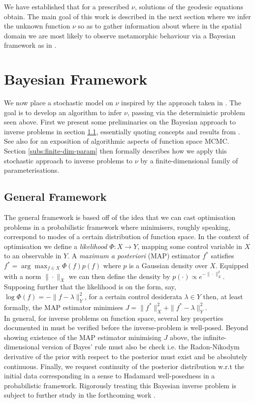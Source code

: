 \documentclass[runningheads]{llncs}
\begin{document}
We have established that for a prescribed $\nu$, solutions of the geodesic
equations obtain. The main goal of this work is described in the next section
where we infer the unknown function $\nu$ so as to gather information about
where in the spatial domain we are most likely to observe metamorphic behaviour
via a Bayesian framework as in \cite{dashti2017bayesian}.

\section{Bayesian Framework}\label{sec:bayesian}

We now place a stochastic model on $\nu$ inspired by the approach taken in
\cite{cotter2013bayesian}. The goal is to develop an algorithm to infer $\nu$,
passing via the deterministic problem seen above.  First we present some
preliminaries on the Bayesian approach to inverse problems in section
\ref{subs:gf}, essentially quoting concepts and results from
\cite{dashti2017bayesian}. See also \cite{cotter2013mcmc} for an exposition of
algorithmic aspects of function space MCMC. Section \ref{subs:finite-dim-param}
then formally describes how we apply this stochastic approach to inverse
problems to $\nu$ by a finite-dimensional family of parameterisations.

\subsection{General Framework}\label{subs:gf}

The general framework is based off of the idea that we can cast optimisation
problems in a probabilistic framework where minimisers, roughly speaking,
correspond to modes of a certain distribution of function space.  In the context
of optimisation we define a \emph{likelihood} $\Phi : X\rightarrow Y$, mapping
some control variable in $X$ to an observable in $Y$.  A \emph{maximum a
posteriori} (MAP) estimator $f^*$ satisfies $f^* = \arg\max_{f\in X} \Phi(f)
p(f)$ where $p$ is a Gaussian density over $X$. Equipped with a norm
$\|\cdot\|_X$ we can then define the density by $p(\cdot) \propto
e^{-\|\cdot\|_X^2}$.  Supposing further that the likelihood is on the form, say,
$\log \Phi(f) = -\|f-\lambda\|_Y^2$, for a certain control desiderata $\lambda\in Y$
then, at least formally, the MAP estimator minimises $J =\|f^*\|_X^2 +
\|f^*-\lambda\|_Y^2$.\\

In general, for inverse problems on function space, several key properties
documented in \cite{?} must be verified before the inverse-problem is
well-posed. Beyond showing existence of the MAP estimator minimising $J$ above,
the infinite-dimensional version of Bayes' rule must also be check i.e. the
Radon-Nikodym derivative of the prior with respect to the posterior must exist
and be absolutely continuous. Finally, we request continuity of the posterior
distribution w.r.t the initial data corresponding in a sense to Hadamard
well-posedness in a probabilistic framework. Rigorously treating this Bayesian
inverse problem is subject to further study in the forthcoming work
\cite{bockarnaudoncotter2019}.
\end{document}
